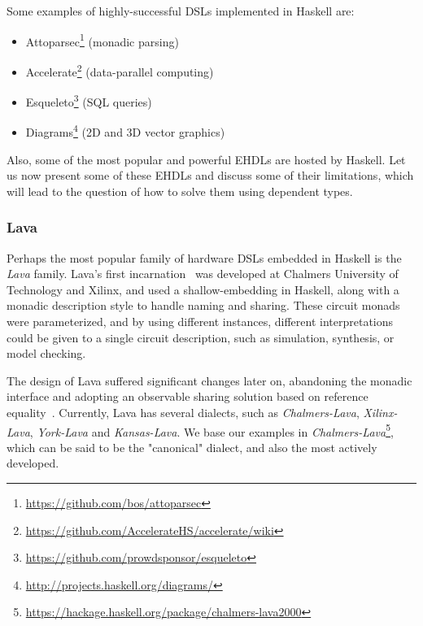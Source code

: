             Some examples of highly-successful \acp{DSL} implemented in Haskell are:

            \begin{itemize}
                \item Attoparsec\footnote{\url{https://github.com/bos/attoparsec}} (monadic parsing)
                \item Accelerate\footnote{\url{https://github.com/AccelerateHS/accelerate/wiki}} (data-parallel computing)
                \item Esqueleto\footnote{\url{https://github.com/prowdsponsor/esqueleto}} (SQL queries)
                \item Diagrams\footnote{\url{http://projects.haskell.org/diagrams/}} (2D and 3D vector graphics)
            \end{itemize}

            Also, some of the most popular and powerful \acp{EHDL} are hosted by Haskell.
            Let us now present some of these \acp{EHDL} and discuss some of their limitations,
            which will lead to the question of how to solve them using dependent types.

            \subsubsection{Lava}
            \label{subsubsec:lava}
            Perhaps the most popular family of hardware \acp{DSL} embedded in Haskell is the \emph{Lava} family.
            Lava's first incarnation~\cite{lava-1999} was developed at Chalmers University of Technology
            and Xilinx, and used a shallow-embedding in Haskell, along with a monadic description style
            to handle naming and sharing.
            These circuit monads were parameterized, and by using different instances,
            different interpretations could be given to a single circuit description, such as
            simulation, synthesis, or model checking.

            The design of Lava suffered significant changes later on, abandoning the monadic interface
            and adopting an observable sharing solution based on reference equality~\cite{observable-sharing-circuits}.
            Currently, Lava has several dialects, such as \emph{Chalmers-Lava}, \emph{Xilinx-Lava}, \emph{York-Lava} and \emph{Kansas-Lava}.
            We base our examples in \emph{Chalmers-Lava}\footnote{\url{https://hackage.haskell.org/package/chalmers-lava2000}},
            which can be said to be the "canonical" dialect, and also the most actively developed.

